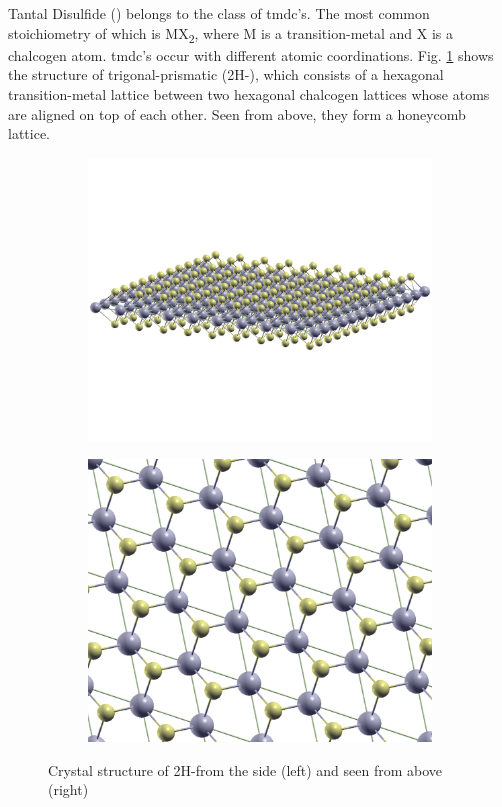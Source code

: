 \documentclass[main.tex]{subfiles}
\begin{document}
Tantal Disulfide (\TaS) belongs to the class of \acrfull{tmdc}'s.
The most common stoichiometry of which is MX\textsubscript{2}, where M is a transition-metal and X is a chalcogen atom.
\acrshort{tmdc}'s occur with different atomic coordinations.
Fig. \ref{fig:tas2_structure} shows the structure of trigonal-prismatic \TaS (2H-\TaS), which consists of a hexagonal transition-metal lattice between two hexagonal chalcogen lattices whose atoms are aligned on top of each other.
Seen from above, they form a honeycomb lattice.

\begin{figure}[ht!]
    \begin{subfigure}{0.49\textwidth}
        \centering
        \includegraphics[width=\textwidth]{structure_images/TaS2_from_the_side.png}
    \end{subfigure}
    \begin{subfigure}{0.49\textwidth}
        \centering
        \includegraphics[width=\textwidth]{structure_images/TaS2_from_above.png}
    \end{subfigure}
    \caption{Crystal structure of 2H-\TaS from the side (left) and seen from above (right)}
    \label{fig:tas2_structure}
\end{figure}
\end{document}
